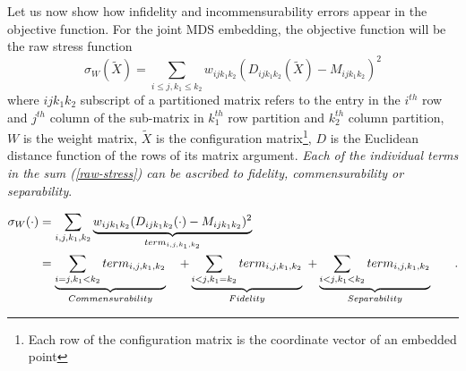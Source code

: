 \documentclass[11pt]{article} %
\begin{document}
Let us now show how infidelity and incommensurability errors  appear in the objective function. For the joint MDS embedding, the objective function will be the raw stress function 
\begin{equation}
\sigma_{W}(\widetilde{X})=\sum_{i\leq j,k_1\leq k_2} {w_{ijk_1k_2}(D_{ijk_1k_2}(\widetilde{X})-M_{ijk_1k_2})^2  }\label{raw-stress}
\end{equation}
 where  $ijk_1k_2$ subscript of a partitioned matrix refers to the entry in the $i^{th}$ row and $j^{th}$ column of the sub-matrix in $k_1^{th}$ row partition and $k_2^{th}$ column partition, $W$ is the weight matrix, $\widetilde{X}$ is the configuration matrix\footnote{Each row of the configuration matrix is the coordinate vector of an embedded point}, $D$ is the Euclidean distance function of the rows of its matrix argument.  \emph{Each of the individual terms in the sum \textrm{(\ref{raw-stress})} can be ascribed to fidelity, commensurability or separability}. %

\begin{align}
\sigma_W(\cdot)  &=  \sum_{i,j,k_1,k_2} \underbrace{{w_{ij{k_1}{k_2}}(D_{ij{k_1}{k_2}}(\cdot)-M_{ijk_1k_2})^2 }}_{term_{i,j,k_1,k_2}}  & \notag\\
\hspace{3pt} &=  \underbrace{\sum_{i=j,k_1<k_2}  term_{i,j,k_1,k_2}}_{Commensurability}  \hspace{10pt}    +  \underbrace{\sum_{i<j,k_1=k_2}   term_{i,j,k_1,k_2}  } _{Fidelity}
\hspace{3pt}+  \underbrace{\sum_{i< j,k_1<k_2}  term_{i,j,k_1,k_2}  } _{Separability}\label{eq:FidCommSep}\hspace{10pt} &.
\end{align}
\end{document}
